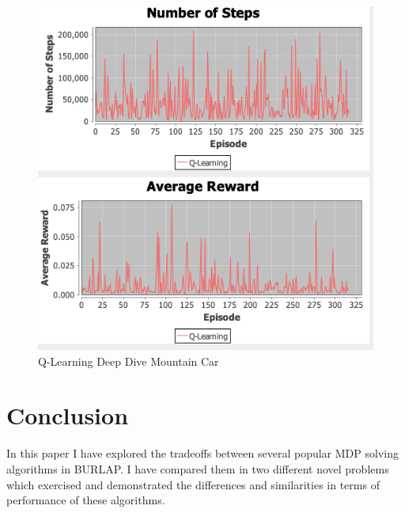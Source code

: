 \documentclass[11pt]{article}
\newcommand{\problemtwo}{Mountain Car}
\begin{document}
    \begin{figure}
        \begin{minipage}{0.5\textwidth}
            \centering
            \includegraphics[width=1\linewidth]{qlearningextended.png}
            \caption{Q-Learning Deep Dive \problemtwo}\label{Fig:Q-Learning Deep Dive \problemtwo}
        \end{minipage}
    \end{figure}


    \section{Conclusion}
    In this paper I have explored the tradeoffs between several popular MDP solving algorithms in BURLAP.
    I have compared them in two different novel problems which exercised and demonstrated the differences and similarities
    in terms of performance of these algorithms.
    
    
\end{document}
